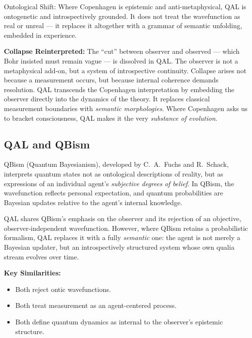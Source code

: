 \documentclass[11pt]{article}
\numberwithin{equation}{section} %
\begin{document}
\bigskip

\noindent Ontological Shift:  
\noindent Where Copenhagen is epistemic and anti-metaphysical, QAL is ontogenetic and introspectively grounded. It does not treat the wavefunction as real or unreal — it replaces it altogether with a grammar of semantic unfolding, embedded in experience.

\bigskip

\noindent\textbf{Collapse Reinterpreted:}  
The “cut” between observer and observed — which Bohr insisted must remain vague — is dissolved in QAL. The observer is not a metaphysical add-on, but a system of introspective continuity. Collapse arises not because a measurement occurs, but because internal coherence demands resolution. QAL transcends the Copenhagen interpretation by embedding the observer directly into the dynamics of the theory. It replaces classical measurement boundaries with \textit{semantic morphologies}. Where Copenhagen asks us to bracket consciousness, QAL makes it the very \textit{substance of evolution}.


\subsection{QAL and QBism}

QBism (Quantum Bayesianism), developed by C.~A.~Fuchs and R.~Schack, interprets quantum states not as ontological descriptions of reality, but as expressions of an individual agent’s \textit{subjective degrees of belief}. In QBism, the wavefunction reflects personal expectation, and quantum probabilities are Bayesian updates relative to the agent’s internal knowledge.

QAL shares QBism’s emphasis on the observer and its rejection of an objective, observer-independent wavefunction. However, where QBism retains a probabilistic formalism, QAL replaces it with a fully \textit{semantic} one: the agent is not merely a Bayesian updater, but an introspectively structured system whose own qualia stream evolves over time.


\bigskip

\noindent\textbf{Key Similarities:}
\begin{itemize}
  \item Both reject ontic wavefunctions.
  \item Both treat measurement as an agent-centered process.
  \item Both define quantum dynamics as internal to the observer's epistemic structure.
\end{itemize}
\end{document}
